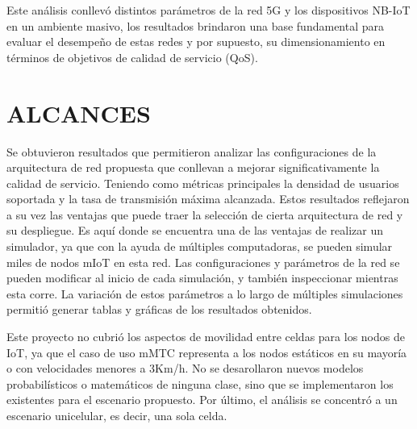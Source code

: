 Este análisis conllevó distintos parámetros de la red 5G y los dispositivos NB-IoT en un ambiente masivo, los resultados brindaron una base fundamental para evaluar el desempeño de estas redes y por supuesto, su dimensionamiento en términos de objetivos de calidad de servicio (QoS).\newline


\section{ALCANCES}

Se obtuvieron resultados que permitieron analizar las configuraciones de la arquitectura de red propuesta que conllevan a mejorar significativamente la calidad de servicio. Teniendo como métricas principales la densidad de usuarios soportada y la tasa de transmisión máxima alcanzada. Estos resultados reflejaron a su vez las ventajas que puede traer la selección de cierta arquitectura de red y su despliegue. Es aquí donde se encuentra una de las ventajas de realizar un simulador, ya que con la ayuda de múltiples computadoras, se pueden simular miles de nodos mIoT en esta red. Las configuraciones y parámetros de la red se pueden modificar al inicio de cada simulación, y también inspeccionar mientras esta corre. La variación de estos parámetros a lo largo de múltiples simulaciones permitió generar tablas y gráficas de los resultados obtenidos.\newline

Este proyecto no cubrió los aspectos de movilidad entre celdas para los nodos de IoT, ya que el caso de uso mMTC representa a los nodos estáticos en su mayoría o con velocidades menores a 3Km/h.  No se desarollaron nuevos modelos probabilísticos o matemáticos de ninguna clase, sino que se implementaron los existentes para el escenario propuesto. Por último, el análisis se concentró a un escenario unicelular, es decir, una sola celda.\newline

